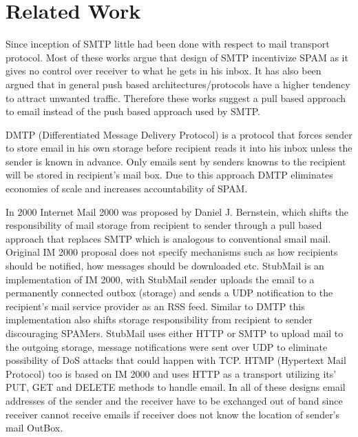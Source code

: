 \section{Related Work}

Since inception of SMTP little had been done with respect to mail transport protocol. Most of these works argue that design of SMTP incentivize SPAM as it gives no control over receiver to what he gets in his inbox. It has also been argued that in general push based architectures/protocols have a higher tendency to attract unwanted traffic\cite{PushVsPull}. Therefore these works suggest a pull based approach to email instead of the push based approach used by SMTP. 

DMTP (Differentiated Message Delivery Protocol) \cite{dtmp} is a protocol that forces sender to store email in his own storage before recipient reads it into his inbox unless the sender is known in advance. Only emails sent by senders knowns to the recipient will be stored in recipient's mail box. Due to this approach DMTP eliminates economies of scale and increases accountability of SPAM.

In 2000 Internet Mail 2000 \cite{im2k} was proposed by Daniel J. Bernstein, which shifts the responsibility of mail storage from recipient to sender through a pull based approach that replaces SMTP which is analogous to conventional smail mail. Original IM 2000 proposal does not specify mechanisms such as how recipients should be notified, how messages should be downloaded etc. StubMail \cite{stubmail} is an implementation of IM 2000, with StubMail sender uploads the email to a permanently connected outbox (storage) and sends a UDP notification to the recipient’s mail service provider as an RSS feed. Similar to DMTP this implementation also shifts storage responsibility from recipient to sender discouraging SPAMers. StubMail uses either HTTP or SMTP to upload mail to the outgoing storage, message notifications were sent over UDP to eliminate possibility of DoS attacks that could happen with TCP. HTMP (Hypertext Mail Protocol)\cite{htmp} too is based on IM 2000 and uses HTTP as a transport utilizing its’ PUT, GET and DELETE methods to handle email. In all of these designs email addresses of the sender and the receiver have to be exchanged out of band since receiver cannot receive emails if receiver does not know the location of sender’s mail OutBox.

